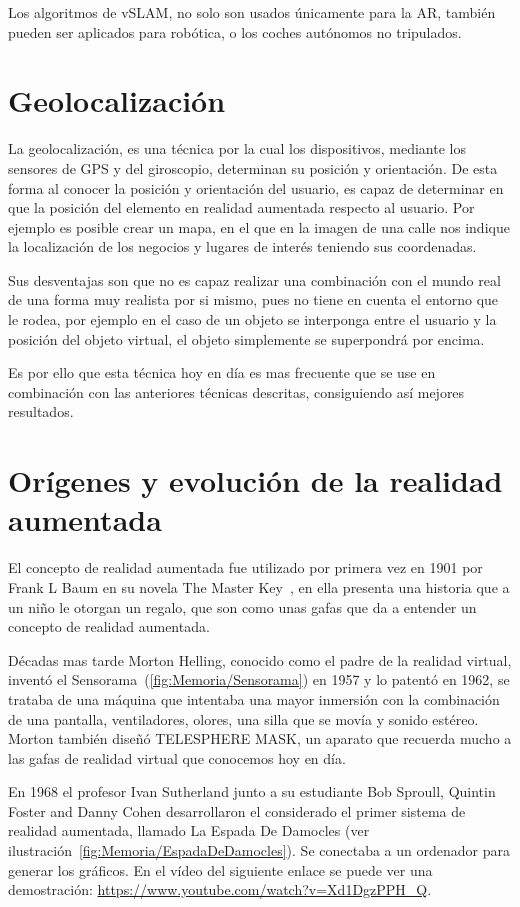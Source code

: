 Los algoritmos de vSLAM, no solo son usados únicamente para la AR, también pueden ser aplicados para robótica, o los coches autónomos no tripulados.

\section{Geolocalización}
La geolocalización, es una técnica por la cual los dispositivos, mediante los sensores de GPS y del giroscopio, determinan su posición y orientación. De esta forma al conocer la posición y orientación del usuario, es capaz de determinar en que la posición del elemento en realidad aumentada respecto al usuario.
Por ejemplo es posible crear un mapa, en el que en la imagen de una calle nos indique la localización de los negocios y lugares de interés teniendo sus coordenadas.

Sus desventajas son que no es capaz realizar una combinación con el mundo real de una forma muy realista por si mismo, pues no tiene en cuenta el entorno que le rodea, por ejemplo en el caso de un objeto se interponga entre el usuario y la posición del objeto virtual, el objeto simplemente se superpondrá por encima.

Es por ello que esta técnica hoy en día es mas frecuente que se use en combinación con las anteriores técnicas descritas, consiguiendo así mejores resultados.

\section{Orígenes y evolución de la realidad aumentada}
El concepto de realidad aumentada fue utilizado por primera vez en 1901 por Frank L Baum en su novela The Master Key~\cite{theMasterKey}, en ella presenta una historia que a un niño le otorgan un regalo, que son como unas gafas que da a entender un concepto de realidad aumentada.

Décadas mas tarde Morton Helling, conocido como el padre de la realidad virtual, inventó el Sensorama~(\ref{fig:Memoria/Sensorama}) en 1957 y lo patentó en 1962, se trataba de una máquina que intentaba una mayor inmersión con la combinación de una pantalla, ventiladores, olores, una silla que se movía y sonido estéreo. Morton también diseñó TELESPHERE MASK, un aparato que recuerda mucho a las gafas de realidad virtual que conocemos hoy en día.


En 1968 el profesor Ivan Sutherland junto a su estudiante Bob Sproull, Quintin Foster and Danny Cohen desarrollaron el considerado el primer sistema de realidad aumentada, llamado La Espada De Damocles (ver ilustración~\ref{fig:Memoria/EspadaDeDamocles}). Se conectaba a un ordenador para generar los gráficos. En el vídeo del siguiente enlace se puede ver una demostración: \url{https://www.youtube.com/watch?v=Xd1DgzPPH_Q}.

